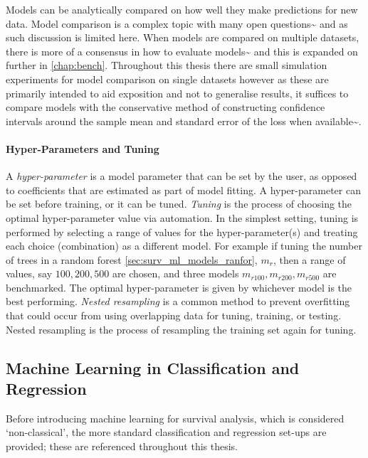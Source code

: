 \documentclass[
  letterpaper,
]{scrbook}
\let\oldparagraph\paragraph
\renewcommand{\paragraph}[1]{\oldparagraph{#1}\mbox{}}
\theoremstyle{plain}
\theoremstyle{definition}
\theoremstyle{remark}
\begin{document}
Models can be analytically compared on how well they make predictions
for new data. Model comparison is a complex topic with many open
questions\textasciitilde{}\cite{Demsar2006, Dietterich1998, Nadeau2003}
and as such discussion is limited here. When models are compared on
multiple datasets, there is more of a consensus in how to evaluate
models\textasciitilde{}\cite{Demsar2006} and this is expanded on further
in \ref{chap:bench}. Throughout this thesis there are small simulation
experiments for model comparison on single datasets however as these are
primarily intended to aid exposition and not to generalise results, it
suffices to compare models with the conservative method of constructing
confidence intervals around the sample mean and standard error of the
loss when available\textasciitilde{}\cite{Nadeau2003}.

\paragraph{Hyper-Parameters and Tuning}

A \emph{hyper-parameter} is a model parameter that can be set by the
user, as opposed to coefficients that are estimated as part of model
fitting. A hyper-parameter can be set before training, or it can be
tuned. \emph{Tuning} is the process of choosing the optimal
hyper-parameter value via automation. In the simplest setting, tuning is
performed by selecting a range of values for the hyper-parameter(s) and
treating each choice (combination) as a different model. For example if
tuning the number of trees in a random forest
\ref{sec:surv_ml_models_ranfor}, \(m_r\), then a range of values, say
\(100, 200, 500\) are chosen, and three models
\(m_{r100}, m_{r200}, m_{r500}\) are benchmarked. The optimal
hyper-parameter is given by whichever model is the best performing.
\emph{Nested resampling} is a common method to prevent overfitting that
could occur from using overlapping data for tuning, training, or
testing. Nested resampling is the process of resampling the training set
again for tuning.

\newpage
\subsection{Machine Learning in Classification and Regression}
\label{sec:surv_ml_car}

Before introducing machine learning for survival analysis, which is
considered `non-classical', the more standard classification and
regression set-ups are provided; these are referenced throughout this
thesis.
\end{document}
